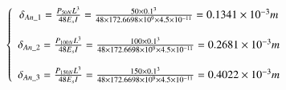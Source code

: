 \begin{Large}
	\begin{equation}
		\label{E 2.1}
		\left\{ \begin{array}{c}
			\delta _{An\_1}=\frac{P_{50N}L^3}{48E_sI}=\frac{50\times 0.1^3}{48\times 172.6698\times 10^9\times 4.5\times 10^{-11}}=0.1341\times 10^{-3}m\\
			\\
			\delta _{An\_2}=\frac{P_{100N}L^3}{48E_sI}=\frac{100\times 0.1^3}{48\times 172.6698\times 10^9\times 4.5\times 10^{-11}}=0.2681\times 10^{-3}m\\
			\\
			\delta _{An\_3}=\frac{P_{150N}L^3}{48E_sI}=\frac{150\times 0.1^3}{48\times 172.6698\times 10^9\times 4.5\times 10^{-11}}=0.4022\times 10^{-3}m\\
		\end{array} \right. 
		\\
	\end{equation}
\end{Large}



\FloatBarrier %



